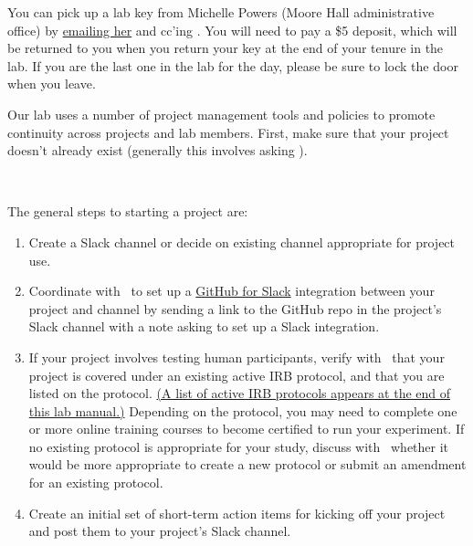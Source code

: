 \documentclass{tufte-book} %
\begin{document}

\noindent You can pick up a lab key from Michelle Powers (Moore Hall
administrative office) by
\href{mailto:Michelle.A.Powers@dartmouth.edu}{emailing her} and cc'ing
\director.  You will need to pay a \$5 deposit, which will be returned
to you when you return your key at the end of your tenure in the lab.
If you are the last one in the lab for the day, please be sure to lock the
door when you leave.


\noindent
Our lab uses a number of project management tools and policies to
promote continuity across projects and lab members.  First, make sure
that your project doesn't already exist (generally this involves
asking \director).

~

The general steps to starting a project are:
\begin{enumerate}

  \item Create a Slack channel or decide on existing channel
    appropriate for project use.
  \item Coordinate with \director~to set up a \href{https://get.slack.help/hc/en-us/articles/232289568-GitHub-for-Slack}{GitHub
      for Slack} integration between your project and channel by sending a link to the GitHub repo in the project's Slack channel with a note asking to set up a Slack integration.
   \item If your project involves testing human participants, verify
     with \director~that your project is covered under an existing
     active IRB protocol, and that you are listed on the protocol. \hyperref[ch:irb]{(A list of
active IRB protocols appears at the end of this lab manual.)}
Depending on the protocol, you may need to complete one or more online
training courses to become certified to run your experiment.  If no
existing protocol is appropriate for your study, discuss with
\director~whether it would be more appropriate to create a new protocol or
submit an amendment for an existing protocol.
    \item Create an initial set of short-term action items for kicking
      off your project and post them to your project's Slack channel.
\end{enumerate}
\end{document}

